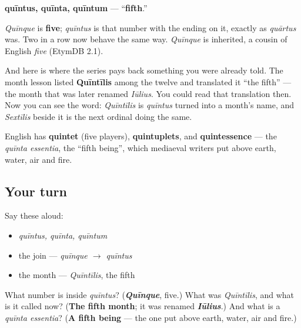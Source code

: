 \begin{cousinweb}
\textbf{quīntus, quīnta, quīntum} — \textquotedblleft{}\textbf{fifth}.\textquotedblright{}

\emph{Quīnque} is \textbf{five}; \emph{quīntus} is that number with the ending on it, exactly as \emph{quārtus} was. Two in a row now behave the same way. \emph{Quīnque} is inherited, a cousin of English \emph{five} (EtymDB 2.1).

And here is where the series pays back something you were already told. The month lesson listed \textbf{Quīntīlis} among the twelve and translated it \textquotedblleft{}the fifth\textquotedblright{} — the month that was later renamed \emph{Iūlius}. You could read that translation then. Now you can see the word: \emph{Quīntīlis} is \emph{quīntus} turned into a month's name, and \emph{Sextīlis} beside it is the next ordinal doing the same.

English has \textbf{quintet} (five players), \textbf{quintuplets}, and \textbf{quintessence} — the \emph{quīnta essentia}, the \textquotedblleft{}fifth being\textquotedblright{}, which mediaeval writers put above earth, water, air and fire.
\end{cousinweb}

\subsection*{Your turn}
Say these aloud:

\begin{itemize}
\raggedright
  \item \emph{quīntus, quīnta, quīntum}
  \item the join — \emph{quīnque $\to$ quīntus}
  \item the month — \emph{Quīntīlis}, the fifth
\end{itemize}

\begin{tcolorbox}[breakable,colback=teal!4,colframe=teal!35!black,title={Before you move on}]
What number is inside \emph{quīntus}? (\emph{\textbf{Quīnque}}, five.) What was \emph{Quīntīlis}, and what is it called now? (\textbf{The fifth month}; it was renamed \emph{\textbf{Iūlius}}.) And what is a \emph{quīnta essentia}? (\textbf{A fifth being} — the one put above earth, water, air and fire.)
\end{tcolorbox}
